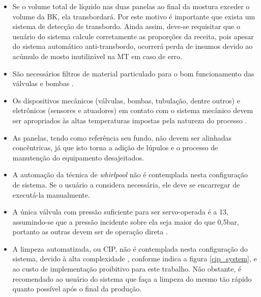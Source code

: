 \begin{itemize}
	\item Se o volume total de líquido nas duas panelas ao final da mostura exceder o volume da BK, ela transbordará. Por este motivo é importante que exista um sistema de detecção de transbordo. Ainda assim, deve-se requisitar que o usuário do sistema calcule corretamente as proporções da receita, pois apesar do sistema automático anti-transbordo, ocorrerá perda de insumos devido ao acúmulo de mosto inutilizável na MT em caso de erro.
	\item São necessários filtros de material particulado para o bom funcionamento das válvulas e bombas \cite{danfoss_solenoid}.
	\item Os dispositivos mecânicos (válvulas, bombas, tubulação, dentre outros) e eletrônicos (sensores e atuadores) em contato com o sistema mecânico devem ser apropriados às altas temperaturas impostas pela natureza do processo \cite{danfoss_solenoid, jefferson_solenoid}.
	\item As panelas, tendo como referência seu fundo, não devem ser alinhadas concêntricas, já que isto torna a adição de lúpulos e o processo de manutenção do equipamento desajeitados.
	\item A automação da técnica de \textit{whirlpool} não é contemplada nesta configuração de sistema. Se o usuário a considera necessária, ele deve se encarregar de executá-la manualmente.
	\item A única válvula com pressão suficiente para ser servo-operada é a 13, assumindo-se que a pressão incidente sobre ela seja maior do que 0,5bar, portanto as outras devem ser de operação direta \cite{danfoss_solenoid, jefferson_solenoid}.
	\item A limpeza automatizada, ou CIP, não é contemplada nesta configuração do sistema, devido à alta complexidade \cite{cip_pres}, conforme indica a figura \ref{cip_system}, e ao custo de implementação proibitivo para este trabalho. Não obstante, é recomendado ao usuário do sistema que faça a limpeza do mesmo tão rápido quanto possível após o final da produção.
\end{itemize}

